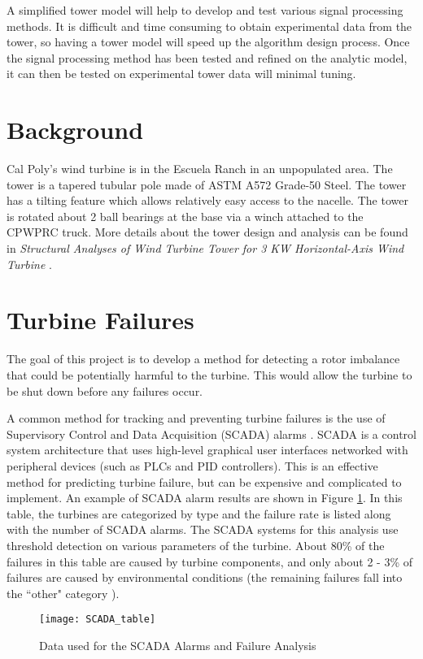 A simplified tower model will help to develop and test various signal processing methods.  It is difficult and time consuming to obtain experimental data from the tower, so having a tower model will speed up the algorithm design process.  Once the signal processing method has been tested and refined on the analytic model, it can then be tested on experimental tower data will minimal tuning.

\section{Background}
Cal Poly’s wind turbine is in the Escuela Ranch in an unpopulated area.  The tower is a tapered tubular pole made of ASTM A572 Grade-50 Steel.  The tower has a tilting feature which allows relatively easy access to the nacelle.  The tower is rotated about 2 ball bearings at the base via a winch attached to the CPWPRC truck.  More details about the tower design and analysis can be found in \textit{Structural Analyses of Wind Turbine Tower for 3 KW Horizontal-Axis Wind Turbine} \cite{Gwon_paper}.

\section{Turbine Failures}
The goal of this project is to develop a method for detecting a rotor imbalance that could be potentially harmful to the turbine.  This would allow the turbine to be shut down before any failures occur.  

A common method for tracking and preventing turbine failures is the use of Supervisory Control and Data Acquisition (SCADA) alarms \cite{WT_failures_paper}.  SCADA is a control system architecture that uses high-level graphical user interfaces networked with peripheral devices (such as PLCs and PID controllers).  This is an effective method for predicting turbine failure, but can be expensive and complicated to implement.  An example of SCADA alarm results are shown in Figure \ref{fig:SCADA_table}.  In this table, the turbines are categorized by type and the failure rate is listed along with the number of SCADA alarms.  The SCADA systems for this analysis use threshold detection on various parameters of the turbine.  About 80\% of the failures in this table are caused by turbine components, and only about 2 - 3\% of failures are caused by environmental conditions (the remaining failures fall into the ``other" category \cite{wind_turbine_failures}).

\begin{figure}
	\centering
	\texttt{[image: SCADA\_table]}
	\decoRule
	\caption{Data used for the SCADA Alarms and Failure Analysis \cite{wind_turbine_failures}}
	\label{fig:SCADA_table}
\end{figure}

